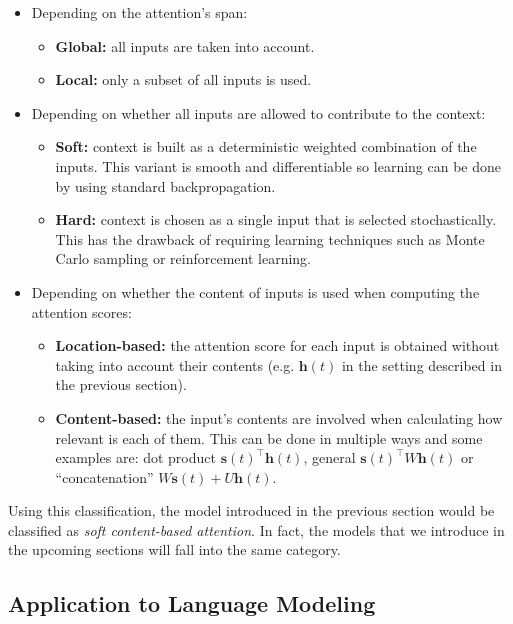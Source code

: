 \begin{itemize}
	\item  Depending on the attention's span:
		\begin{itemize}
			\itemsep 0em
			\item  \textbf{Global:} all inputs are taken into account.
			\item  \textbf{Local:} only a subset of all inputs is used.
		\end{itemize}
	\item  Depending on whether all inputs are allowed to contribute to the context:
		\begin{itemize}
			\itemsep 0em
			\item  \textbf{Soft:} context is built as a deterministic weighted combination of the inputs. This variant is smooth and differentiable so learning can be done by using standard backpropagation.
			\item  \textbf{Hard:} context is chosen as a single input that is selected stochastically. This has the drawback of requiring learning techniques such as Monte Carlo sampling or reinforcement learning.
		\end{itemize}
	\item  Depending on whether the content of inputs is used when computing the attention scores:
		\begin{itemize}
			\itemsep 0em
			\item  \textbf{Location-based:} the attention score for each input is obtained without taking into account their contents (e.g. $\mathbf{h}(t)$ in the setting described in the previous section).
			\item  \textbf{Content-based:} the input's contents are involved when calculating how relevant is each of them. This can be done in multiple ways and some examples are: dot product $\mathbf{s}(t)^{\top}\mathbf{h}(t)$, general $\mathbf{s}(t)^{\top}W\mathbf{h}(t)$ or ``concatenation'' $W\mathbf{s}(t) + U\mathbf{h}(t)$.		
		\end{itemize}	
\end{itemize}

Using this classification, the model introduced in the previous section would be classified as \textit{soft content-based attention}. In fact, the models that we introduce in the upcoming sections will fall into the same category.

\subsection{Application to Language Modeling}

